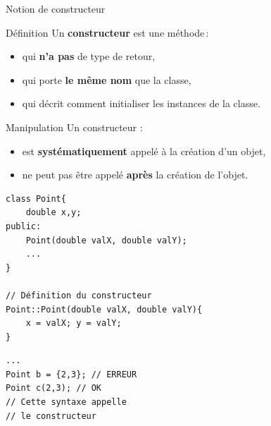 \begin{frame}[fragile]{Notion de constructeur}

    \begin{block}{Définition}
      Un \textbf{constructeur} est une méthode\,:
      \begin{itemize}
          \item qui \textbf{n'a pas} de type de retour,
          \item qui porte \textbf{le même nom} que la classe,
          \item qui décrit comment initialiser les instances de la classe.
      \end{itemize}
    \end{block}
    \begin{overprint}
    \begin{alertblock}{Manipulation}
      Un constructeur :
      \begin{itemize}
          \item est \textbf{systématiquement} appelé à la création d'un objet,
          \item ne peut pas être appelé \textbf{après} la création de l'objet.
      \end{itemize}
    \end{alertblock}

    \begin{minipage}{\linewidth}
    \begin{minipage}{0.59\linewidth}
            \begin{verbatim}
class Point{
    double x,y;
public:
    Point(double valX, double valY);
    ...
}

// Définition du constructeur
Point::Point(double valX, double valY){
    x = valX; y = valY;
}
            \end{verbatim}
    \end{minipage}
    \hfill
    \begin{minipage}{0.39\linewidth}
            \begin{verbatim}
...
Point b = {2,3}; // ERREUR
Point c(2,3); // OK
// Cette syntaxe appelle
// le constructeur
            \end{verbatim}
        
    \end{minipage}
    \end{minipage}
    \end{overprint}
\end{frame}

